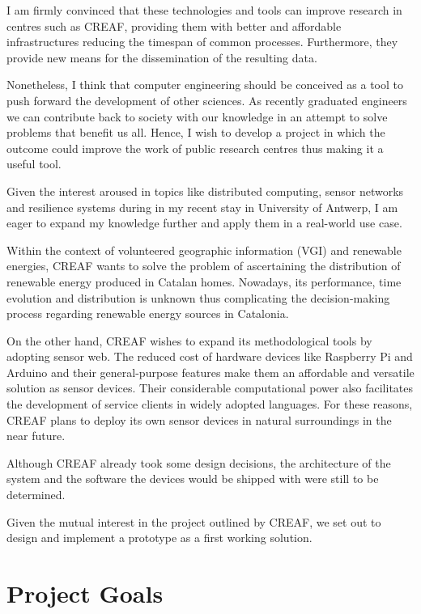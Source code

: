 I am firmly convinced that these technologies and tools can improve research in centres such as CREAF, providing them with better and affordable infrastructures reducing the timespan of common processes. Furthermore, they provide new means for the dissemination of the resulting data.

Nonetheless, I think that computer engineering should be conceived as a tool to push forward the development of other sciences. As recently graduated engineers we can contribute back to society with our knowledge in an attempt to solve problems that benefit us all. Hence, I wish to develop a project in which the outcome could improve the work of  public research centres thus making it a useful tool.

Given the interest aroused in topics like distributed computing, sensor networks and resilience systems during in my recent stay in University of Antwerp, I am eager to expand my knowledge further and apply them in a real-world use case.

Within the context of volunteered geographic information (VGI) and renewable energies, CREAF wants to solve the problem of ascertaining the distribution of renewable energy produced in Catalan homes. Nowadays, its performance, time evolution and distribution is unknown thus complicating the decision-making process regarding renewable energy sources in Catalonia.

On the other hand, CREAF wishes to expand its methodological tools by adopting sensor web. The reduced cost of hardware devices like Raspberry Pi and Arduino  and their general-purpose features make them an affordable and versatile solution as sensor devices. Their considerable computational power also facilitates the development of service clients in widely adopted languages. For these reasons, CREAF plans to deploy its own sensor devices in natural surroundings in the near future. 

Although CREAF already took some design decisions, the architecture of the system and the software the devices would be shipped with were still to be determined.

Given the mutual interest in the project outlined by CREAF, we set out to design and implement a prototype as a first working solution.

\section{Project Goals} \label{project_goals}

